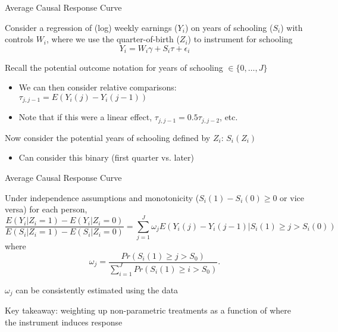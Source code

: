 \documentclass[notes,11pt, aspectratio=169]{beamer}
\newenvironment{wideitemize}{\itemize\addtolength{\itemsep}{10pt}}{\enditemize}
\begin{document}
\begin{frame}{Average Causal Response Curve}
  \begin{wideitemize}
  \item Consider a regression of (log) weekly earnings ($Y_{i}$) on
    years of schooling ($S_{i}$) with controls $W_{i}$, where we use
    the quarter-of-birth     ($Z_{i}$) to instrument for schooling
    \begin{equation*}
      Y_{i} = W_{i}\gamma + S_{i}\tau + \epsilon_{i}
    \end{equation*}
  \item Recall the potential outcome notation for years of schooling $\in \{0,\ldots, J\}$
    \begin{itemize}
    \item We can then consider relative comparisons: $\tau_{j,j-1} = E(Y_{i}(j) - Y_{i}(j-1))$
    \item Note that if this were a linear effect, $\tau_{j,j-1} = 0.5\tau_{j,j-2}$, etc.
    \end{itemize}
  \item Now consider the potential years of schooling defined by $Z_{i}$: $S_{i}(Z_{i})$
    \begin{itemize}
    \item Can consider this binary (first quarter vs. later)
    \end{itemize}
  \end{wideitemize}
\end{frame}

\begin{frame}{Average Causal Response Curve}
  \begin{wideitemize}
  \item Under independence assumptions and monotonicity
    ($S_{i}(1) -S_{i}(0) \geq 0$ or vice versa) for each person,
    \begin{equation*}
      \frac{E(Y_{i} | Z_{i} = 1) - E(Y_{i} | Z_{i} = 0)}{E(S_{i} | Z_{i} = 1) - E(S_{i} | Z_{i} = 0)} = \sum_{j=1}^{J}\omega_{j}E(Y_{i}(j) - Y_{i}(j-1) | S_{i}(1) \geq j > S_{i}(0))
    \end{equation*}
    where
    \begin{equation*}
      \omega_{j} = \frac{Pr(S_{i}(1) \geq j > S_{0})}{\sum_{i=1}^{J} Pr(S_{i}(1) \geq i > S_{0})}.
      \end{equation*}
    \item $\omega_{j}$ can be consistently estimated using the data
  \item Key takeaway: weighting up non-parametric treatments as a
    function of where the instrument induces response
  \end{wideitemize}
\end{frame}
\end{document}
